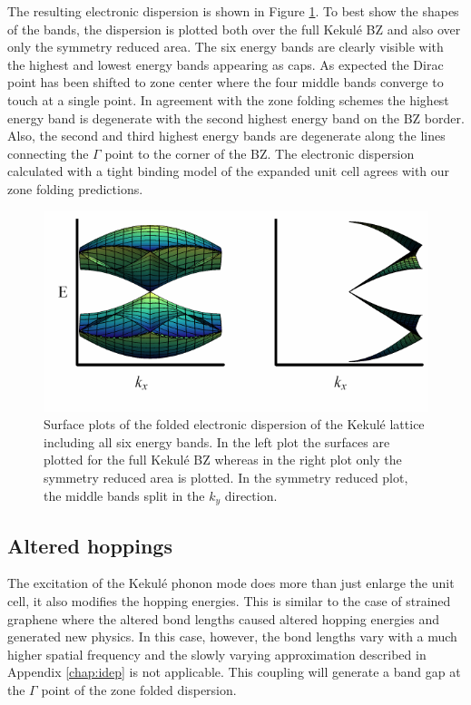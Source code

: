 The resulting electronic dispersion is shown in Figure \ref{fig:kek:zfdisp}.
To best show the shapes of the bands, the dispersion is plotted both over the full Kekul\'e BZ and also over only the symmetry reduced area.
The six energy bands are clearly visible with the highest and lowest energy bands appearing as caps.
As expected the Dirac point has been shifted to zone center where the four middle bands converge to touch at a single point.
In agreement with the zone folding schemes the highest energy band is degenerate with the second highest energy band on the BZ border.
Also, the second and third highest energy bands are degenerate along the lines connecting the $\Gamma$ point to the corner of the BZ.
The electronic dispersion calculated with a tight binding model of the expanded unit cell agrees with our zone folding predictions.

\begin{figure}
	\begin{center}
	\includegraphics{Figs_Kekule/ZoneFolded.pdf}
	\end{center}
	\caption[Surface plots of the folded electronic dispersion of the Kekul\'e lattice]{\label{fig:kek:zfdisp}
		Surface plots of the folded electronic dispersion of the Kekul\'e lattice including all six energy bands.
		In the left plot the surfaces are plotted for the full Kekul\'e BZ whereas in the right plot only the symmetry reduced area is plotted.
		In the symmetry reduced plot, the middle bands split in the $k_y$ direction.
	}
\end{figure}

\subsection{Altered hoppings}
The excitation of the Kekul\'e phonon mode does more than just enlarge the unit cell, it also modifies the hopping energies.
This is similar to the case of strained graphene where the altered bond lengths caused altered hopping energies and generated new physics.
In this case, however, the bond lengths vary with a much higher spatial frequency and the slowly varying approximation described in Appendix \ref{chap:idep} is not applicable.
This coupling will generate a band gap at the $\Gamma$ point of the zone folded dispersion.

